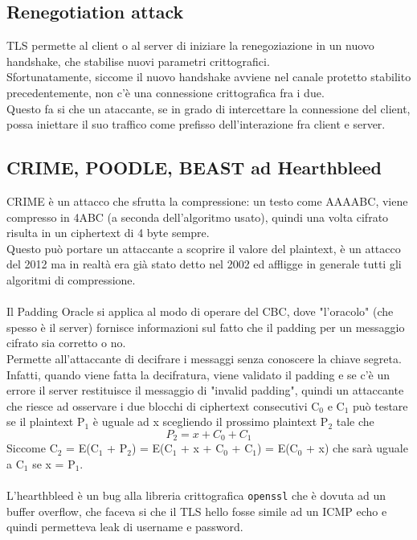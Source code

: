 \documentclass[12pt, oneside]{extbook} %
\begin{document}
\subsection{Renegotiation attack}
TLS permette al client o al server di iniziare la renegoziazione in un nuovo handshake, che stabilise nuovi parametri crittografici.
\\Sfortunatamente, siccome il nuovo handshake avviene nel canale protetto stabilito precedentemente, non c'è una connessione crittografica fra i due.
\\Questo fa si che un ataccante, se in grado di intercettare la connessione del client, possa iniettare il suo traffico come prefisso dell'interazione fra client e server.

\subsection{CRIME, POODLE, BEAST ad Hearthbleed}
CRIME è un attacco che sfrutta la compressione: un testo come AAAABC, viene compresso in 4ABC (a seconda dell'algoritmo usato), quindi una volta cifrato risulta in un ciphertext di 4 byte sempre.
\\Questo può portare un attaccante a scoprire il valore del plaintext, è un attacco del 2012 ma in realtà era già stato detto nel 2002 ed affligge in generale tutti gli algoritmi di compressione.
\\\\
Il Padding Oracle si applica al modo di operare del CBC, dove "l'oracolo" (che spesso è il server) fornisce informazioni sul fatto che il padding per un messaggio cifrato sia corretto o no.
\\Permette all'attaccante di decifrare i messaggi senza conoscere la chiave segreta.
\\Infatti, quando viene fatta la decifratura, viene validato il padding e se c'è un errore il server restituisce il messaggio di "invalid padding", quindi un attaccante che riesce ad osservare i due blocchi di ciphertext consecutivi C$_0$ e C$_1$ può testare se il plaintext P$_1$ è uguale ad x scegliendo il prossimo plaintext P$_2$ tale che
\begin{equation}
    P_2 = x + C_0 + C_1
\end{equation}
Siccome C$_2$ = E(C$_1$ + P$_2$) = E(C$_1$ + x + C$_0$ + C$_1$) = E(C$_0$ + x) che sarà uguale a C$_1$ se x = P$_1$.
\\\\
L'hearthbleed è un bug alla libreria crittografica \texttt{openssl} che è dovuta ad un buffer overflow, che faceva si che il TLS hello fosse simile ad un ICMP echo e quindi permetteva leak di username e password.
\end{document}

